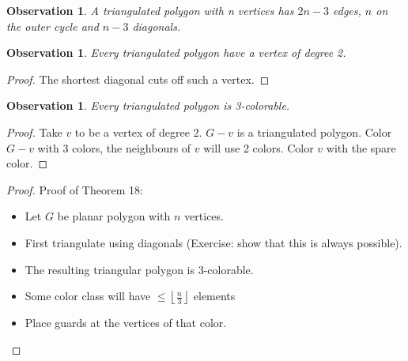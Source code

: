 \documentclass[a4paper]{article}
\theoremstyle{plain}
\newtheorem{observation}[lemma]{Observation}
\theoremstyle{myremark}
\begin{document}
\begin{observation}
A triangulated polygon with n vertices has $2n-3$ edges, $n$ on the outer cycle and $n-3$ diagonals.
\end{observation}

\begin{observation}
Every triangulated polygon have a vertex of degree 2.
\end{observation}
\begin{proof}
The shortest diagonal cuts off such a vertex.
\end{proof}

\begin{observation}
Every triangulated polygon is 3-colorable.
\end{observation}
\begin{proof}
Take $v$ to be a vertex of degree 2. $G-v$ is a triangulated polygon. Color $G-v$ with 3 colors, the neighbours of $v$ will use 2 colors. Color $v$ with the spare color.
\end{proof}

\begin{proof}
Proof of Theorem 18:

\begin{itemize}
\item Let $G$ be planar polygon with $n$ vertices.
\item First triangulate using diagonals (Exercise: show that this is always possible).
\item The resulting triangular polygon is 3-colorable. 
\item Some color class will have $\leq \left \lfloor \frac{n}{3} \right \rfloor$ elements
\item Place guards at the vertices of that color.
\end{itemize}
\end{proof}
\end{document}
